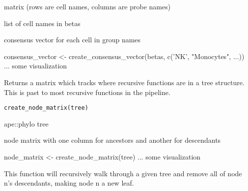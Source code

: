 \documentclass[a4paper]{book}
\begin{document}
%
\begin{Arguments}
\begin{ldescription}
\item[\code{betas}] matrix (rows are cell names, columns are probe names)

\item[\code{group\_names}] list of cell names in betas
\end{ldescription}
\end{Arguments}
%
\begin{Value}
consensus vector for each cell in group names
\end{Value}
%
\begin{Examples}
\begin{ExampleCode}
consensus_vector <- create_consensus_vector(betas, c('NK', "Monocytes", 
...))
... some visualization 
\end{ExampleCode}
\end{Examples}
%
\begin{Description}\relax
Returns a matrix which tracks where recursive functions are in a tree 
structure. This is past to most recursive functions in the pipeline.
\end{Description}
%
\begin{Usage}
\begin{verbatim}
create_node_matrix(tree)
\end{verbatim}
\end{Usage}
%
\begin{Arguments}
\begin{ldescription}
\item[\code{tree}] ape::phylo tree
\end{ldescription}
\end{Arguments}
%
\begin{Value}
node matrix with one column for ancestors and another for 
descendants
\end{Value}
%
\begin{Examples}
\begin{ExampleCode}
node_matrix <- create_node_matrix(tree)
... some visualization 
\end{ExampleCode}
\end{Examples}
%
\begin{Description}\relax
This function will recursively walk through a given tree and remove all of 
node n's descendants, making node n a new leaf.
\end{Description}
\end{document}
